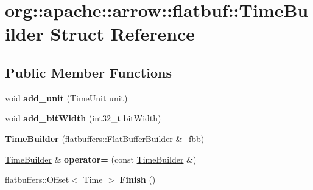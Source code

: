 \hypertarget{structorg_1_1apache_1_1arrow_1_1flatbuf_1_1TimeBuilder}{}\section{org\+:\+:apache\+:\+:arrow\+:\+:flatbuf\+:\+:Time\+Builder Struct Reference}
\label{structorg_1_1apache_1_1arrow_1_1flatbuf_1_1TimeBuilder}
\subsection*{Public Member Functions}
\begin{DoxyCompactItemize}
\item 
void {\bfseries add\+\_\+unit} (Time\+Unit unit)\hypertarget{structorg_1_1apache_1_1arrow_1_1flatbuf_1_1TimeBuilder_a0090ce7e0a2754783e4e9cc565065915}{}\label{structorg_1_1apache_1_1arrow_1_1flatbuf_1_1TimeBuilder_a0090ce7e0a2754783e4e9cc565065915}

\item 
void {\bfseries add\+\_\+bit\+Width} (int32\+\_\+t bit\+Width)\hypertarget{structorg_1_1apache_1_1arrow_1_1flatbuf_1_1TimeBuilder_a9b9228f46dd637bb2c4272582b3a36c1}{}\label{structorg_1_1apache_1_1arrow_1_1flatbuf_1_1TimeBuilder_a9b9228f46dd637bb2c4272582b3a36c1}

\item 
{\bfseries Time\+Builder} (flatbuffers\+::\+Flat\+Buffer\+Builder \&\+\_\+fbb)\hypertarget{structorg_1_1apache_1_1arrow_1_1flatbuf_1_1TimeBuilder_a228e7dc723c03d07565a74e7a74239ba}{}\label{structorg_1_1apache_1_1arrow_1_1flatbuf_1_1TimeBuilder_a228e7dc723c03d07565a74e7a74239ba}

\item 
\hyperlink{structorg_1_1apache_1_1arrow_1_1flatbuf_1_1TimeBuilder}{Time\+Builder} \& {\bfseries operator=} (const \hyperlink{structorg_1_1apache_1_1arrow_1_1flatbuf_1_1TimeBuilder}{Time\+Builder} \&)\hypertarget{structorg_1_1apache_1_1arrow_1_1flatbuf_1_1TimeBuilder_abc69d8aea16dfd32dc2d3fbcc21656a1}{}\label{structorg_1_1apache_1_1arrow_1_1flatbuf_1_1TimeBuilder_abc69d8aea16dfd32dc2d3fbcc21656a1}

\item 
flatbuffers\+::\+Offset$<$ Time $>$ {\bfseries Finish} ()\hypertarget{structorg_1_1apache_1_1arrow_1_1flatbuf_1_1TimeBuilder_af6b356ce5b157fbd55be360b9177837c}{}\label{structorg_1_1apache_1_1arrow_1_1flatbuf_1_1TimeBuilder_af6b356ce5b157fbd55be360b9177837c}

\end{DoxyCompactItemize}
